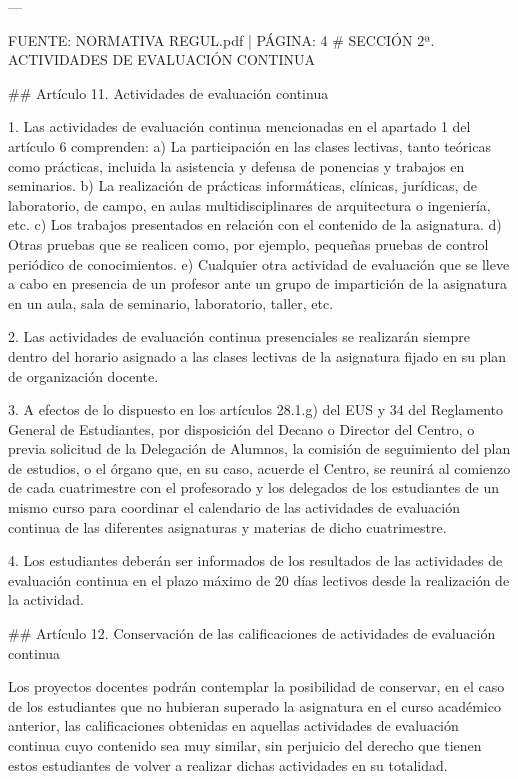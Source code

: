 \documentclass{article}
\begin{document}
\begin{itemize}
\begin{itemize}
\begin{scriptsize}
                  ---

                  FUENTE: NORMATIVA REGUL.pdf | PÁGINA: 4
                  \# SECCIÓN 2ª. ACTIVIDADES DE EVALUACIÓN CONTINUA

                  \#\# Artículo 11. Actividades de evaluación continua

                  1. Las actividades de evaluación continua mencionadas en el apartado 1 del artículo 6 comprenden:
                  a) La participación en las clases lectivas, tanto teóricas como prácticas, incluida la asistencia y defensa de ponencias y trabajos en seminarios.
                  b) La realización de prácticas informáticas, clínicas, jurídicas, de laboratorio, de campo, en aulas multidisciplinares de arquitectura o ingeniería, etc.
                  c) Los trabajos presentados en relación con el contenido de la asignatura.
                  d) Otras pruebas que se realicen como, por ejemplo, pequeñas pruebas de control periódico de conocimientos.
                  e) Cualquier otra actividad de evaluación que se lleve a cabo en presencia de un profesor ante un grupo de impartición de la asignatura en un aula, sala de seminario, laboratorio, taller, etc.

                  2. Las actividades de evaluación continua presenciales se realizarán siempre dentro del horario asignado a las clases lectivas de la asignatura fijado en su plan de organización docente.

                  3. A efectos de lo dispuesto en los artículos 28.1.g) del EUS y 34 del Reglamento General de Estudiantes, por disposición del Decano o Director del Centro, o previa solicitud de la Delegación de Alumnos, la comisión de seguimiento del plan de estudios, o el órgano que, en su caso, acuerde el Centro, se reunirá al comienzo de cada cuatrimestre con el profesorado y los delegados de los estudiantes de un mismo curso para coordinar el calendario de las actividades de evaluación continua de las diferentes asignaturas y materias de dicho cuatrimestre.

                  4. Los estudiantes deberán ser informados de los resultados de las actividades de evaluación continua en el plazo máximo de 20 días lectivos desde la realización de la actividad.

                  \#\# Artículo 12. Conservación de las calificaciones de actividades de evaluación continua

                  Los proyectos docentes podrán contemplar la posibilidad de conservar, en el caso de los estudiantes que no hubieran superado la asignatura en el curso académico anterior, las calificaciones obtenidas en aquellas actividades de evaluación continua cuyo contenido sea muy similar, sin perjuicio del derecho que tienen estos estudiantes de volver a realizar dichas actividades en su totalidad.


\end{scriptsize}
\end{itemize}
\end{itemize}
\end{document}
